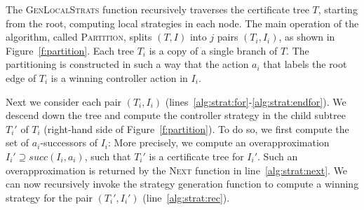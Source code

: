 The \textsc{GenLocalStrats} function recursively traverses the
certificate tree $T$, starting from the root, computing local
strategies in each node.
The main operation of the algorithm, called \textsc{Partition},
splits $(T,I)$ into $j$ pairs $(T_i, I_i)$, as shown in
Figure~\ref{f:partition}.  Each tree $T_i$ is a copy of a single
branch of $T$.  The partitioning is constructed in such a way that
the action $a_i$ that labels the root edge of $T_i$ is a winning
controller action in $I_i$.



Next we consider each pair $(T_i, I_i)$
(lines~\ref{alg:strat:for}-\ref{alg:strat:endfor}). We descend
down the tree and compute the controller strategy in the child
subtree $T_i'$ of $T_i$ (right-hand side of Figure~\ref{f:partition}).
To do so, we first compute the set of $a_i$-successors of $I_i$:
More precisely, we compute an overapproximation $I_i'\supseteq
succ(I_i, a_i)$, such that $T_i'$ is a certificate
tree for $I_i'$.  Such an overapproximation is returned by the
\textsc{Next} function in line~\ref{alg:strat:next}.  We can now
recursively invoke the strategy generation function to compute a
winning strategy for the pair $(T_i', I_i')$
(line~\ref{alg:strat:rec}).


